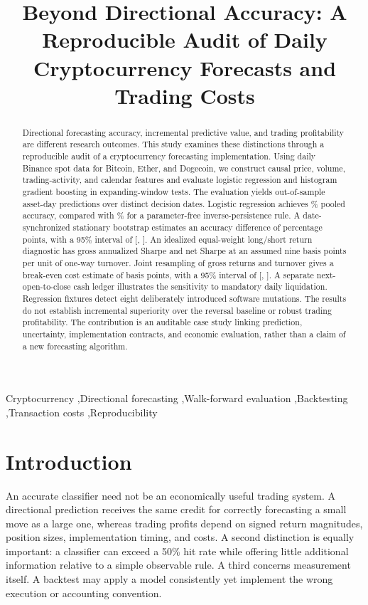 \documentclass[preprint,12pt,authoryear]{elsarticle}
\begin{document}
\begin{frontmatter}
\title{Beyond Directional Accuracy: A Reproducible Audit of Daily Cryptocurrency Forecasts and Trading Costs}
\begin{abstract}
Directional forecasting accuracy, incremental predictive value, and trading profitability are different research outcomes. This study examines these distinctions through a reproducible audit of a cryptocurrency forecasting implementation. Using daily Binance spot data for Bitcoin, Ether, and Dogecoin, we construct \FeatureCount{} causal price, volume, trading-activity, and calendar features and evaluate logistic regression and histogram gradient boosting in expanding-window tests. The evaluation yields \PredictionCount{} out-of-sample asset-day predictions over \PanelDays{} distinct decision dates. Logistic regression achieves \LogisticAccuracy\% pooled accuracy, compared with \InverseAccuracy\% for a parameter-free inverse-persistence rule. A date-synchronized stationary bootstrap estimates an accuracy difference of \PooledDifference{} percentage points, with a 95\% interval of [\PooledLow, \PooledHigh]. An idealized equal-weight long/short return diagnostic has gross annualized Sharpe \GrossSharpe{} and net Sharpe \NetSharpe{} at an assumed nine basis points per unit of one-way turnover. Joint resampling of gross returns and turnover gives a break-even cost estimate of \CostRoot{} basis points, with a 95\% interval of [\RootLow, \RootHigh]. A separate next-open-to-close cash ledger illustrates the sensitivity to mandatory daily liquidation. Regression fixtures detect eight deliberately introduced software mutations. The results do not establish incremental superiority over the reversal baseline or robust trading profitability. The contribution is an auditable case study linking prediction, uncertainty, implementation contracts, and economic evaluation, rather than a claim of a new forecasting algorithm.
\end{abstract}
\begin{keyword}
Cryptocurrency \sep Directional forecasting \sep Walk-forward evaluation \sep Backtesting \sep Transaction costs \sep Reproducibility
\end{keyword}
\end{frontmatter}

\section{Introduction}
An accurate classifier need not be an economically useful trading system. A directional prediction receives the same credit for correctly forecasting a small move as a large one, whereas trading profits depend on signed return magnitudes, position sizes, implementation timing, and costs. A second distinction is equally important: a classifier can exceed a 50\% hit rate while offering little additional information relative to a simple observable rule. A third concerns measurement itself. A backtest may apply a model consistently yet implement the wrong execution or accounting convention.
\end{document}
